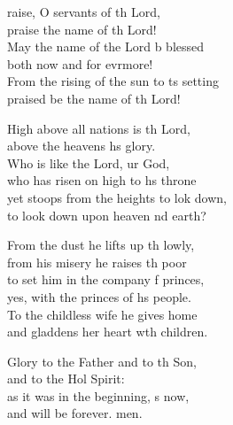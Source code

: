 \settowidth{\versewidth}{From the rising of the sun to its setting *}
\begin{psalmverse}%
  \begin{patverse}
raise, O servants of th Lord,\Med\\
praise the name of th Lord!\\
May the name of the Lord b blessed\Med\\
both now and for evrmore!\\
From the rising of the sun to \pointup{\i}ts setting\Med\\
praised be the name of th Lord!

High above all nations is th Lord,\Med\\
above the heavens h\pointup{\i}s glory.\\
Who is like the Lord, ur God,\Med\\
who has risen on high to h\pointup{\i}s throne\\
yet stoops from the heights to lok down,\Med\\
to look down upon heaven nd earth?

From the dust he lifts up th lowly,\Med\\
from his misery he raises th poor\\
to set him in the company f princes,\Med\\
yes, with the princes of h\pointup{\i}s people.\\
To the childless wife he gives  home\Med\\
and gladdens her heart w\pointup{\i}th children.

Glory to the Father and to th Son,\Med\\
and to the Hol Spirit:\\
as it was in the beginning, \pointup{\i}s now,\Med\\
and will be forever. men.
  \end{patverse}
\end{psalmverse}
